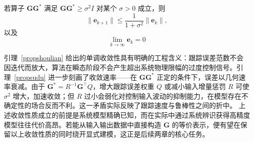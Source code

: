 \begin{lemma}
	\label{propsudu}
	若算子 \(\mathbf{G} \mathbf{G}^*\) 满足 \(\mathbf{G} \mathbf{G}^* \geq \sigma^2 I\) 对某个 \(\sigma > 0\) 成立，则
	\begin{equation}
		\|\mathbf{e}_{k+1}\| \leq \frac{1}{1 + \sigma^2} \|\mathbf{e}_{k}\|,
		\label{eq:exp_convergence}
	\end{equation}
	以及
	\begin{equation}
		\lim_{k \to \infty} \mathbf{e}_{k} = 0
		\label{eq:exp_limit}
	\end{equation}
\end{lemma}

引理~\ref{propshoulian} 给出的单调收敛性具有明确的工程含义：跟踪误差范数不会因迭代而放大，算法在瞬态阶段不会产生超出系统物理限幅的过度控制信号。引理~\ref{propsudu} 进一步刻画了收敛速率——在 \(\mathbf{G}\mathbf{G}^*\) 正定的条件下，误差以几何速率衰减。由于 \(\mathbf{G}^* = R^{-1}\mathbf{G}^\top Q\)，增大跟踪误差权重 \(Q\) 或减小输入增量惩罚 \(R\) 可使 \(\sigma^2\) 增大，加速收敛；但 \(R\) 过小会弱化对控制输入波动的抑制能力，在模型存在不确定性的场合反而不利。这一矛盾实际反映了跟踪速度与鲁棒性之间的折中。
上述收敛性质成立的前提是系统模型精确已知，而在实际中通过系统辨识获得高精度模型往往代价高昂。若能从输入输出数据中直接构造 \(\mathbf{G}\) 的等价表示，便有望在保留以上收敛性质的同时绕开显式建模，这正是后续两章的核心任务。
